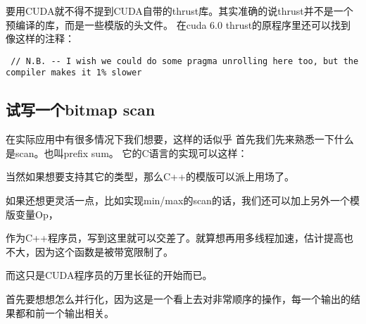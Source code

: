 要用CUDA就不得不提到CUDA自带的thrust库。其实准确的说thrust并不是一个预编译的库，而是一些模版的头文件。
在cuda 6.0 thrust的原程序里还可以找到像这样的注释：

\begin{lstlisting}
 // N.B. -- I wish we could do some pragma unrolling here too, but the compiler makes it 1% slower
\end{lstlisting}
 
\subsection{试写一个bitmap scan}

在实际应用中有很多情况下我们想要，这样的话似乎
首先我们先来熟悉一下什么是scan。也叫prefix sum。
它的C语言的实现可以这样：

\myvspace


当然如果想要支持其它的类型，那么C++的模版可以派上用场了。
\myvspace

如果还想更灵活一点，比如实现min/max的scan的话，我们还可以加上另外一个模版变量Op，
\myvspace


作为C++程序员，写到这里就可以交差了。就算想再用多线程加速，估计提高也不大，因为这个函数是被带宽限制了。

而这只是CUDA程序员的万里长征的开始而已。

首先要想想怎么并行化，因为这是一个看上去对非常顺序的操作，每一个输出的结果都和前一个输出相关。

%

